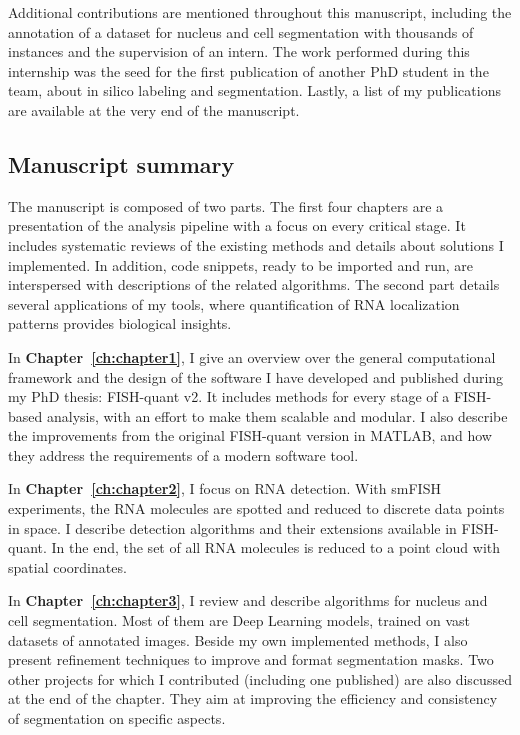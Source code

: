 \noindent
Additional contributions are mentioned throughout this manuscript, including the annotation of a dataset for nucleus and cell segmentation with thousands of instances and the supervision of an intern.
The work performed during this internship was the seed for the first publication of another PhD student in the team, about in silico labeling and segmentation.
Lastly, a list of my publications are available at the very end of the manuscript.

\subsection{Manuscript summary}
\label{subsec:intro_manuscript}

The manuscript is composed of two parts.
The first four chapters are a presentation of the analysis pipeline with a focus on every critical stage.
It includes systematic reviews of the existing methods and details about solutions I implemented.
In addition, code snippets, ready to be imported and run, are interspersed with descriptions of the related algorithms.
The second part details several applications of my tools, where quantification of \ac{RNA} localization patterns provides biological insights.

In \textbf{Chapter~\ref{ch:chapter1}}, I give an overview over the general computational framework and the design of the software I have developed and published during my PhD thesis: FISH-quant v2.
It includes methods for every stage of a \ac{FISH}-based analysis, with an effort to make them scalable and modular.
I also describe the improvements from the original FISH-quant version in MATLAB, and how they address the requirements of a modern software tool.

In \textbf{Chapter~\ref{ch:chapter2}}, I focus on \ac{RNA} detection.
With \ac{smFISH} experiments, the \ac{RNA} molecules are spotted and reduced to discrete data points in space.
I describe detection algorithms and their extensions available in FISH-quant.
In the end, the set of all \ac{RNA} molecules is reduced to a point cloud with spatial coordinates.

In \textbf{Chapter~\ref{ch:chapter3}}, I review and describe algorithms for nucleus and cell segmentation.
Most of them are Deep Learning models, trained on vast datasets of annotated images.
Beside my own implemented methods, I also present refinement techniques to improve and format segmentation masks.
Two other projects for which I contributed (including one published) are also discussed at the end of the chapter.
They aim at improving the efficiency and consistency of segmentation on specific aspects.

